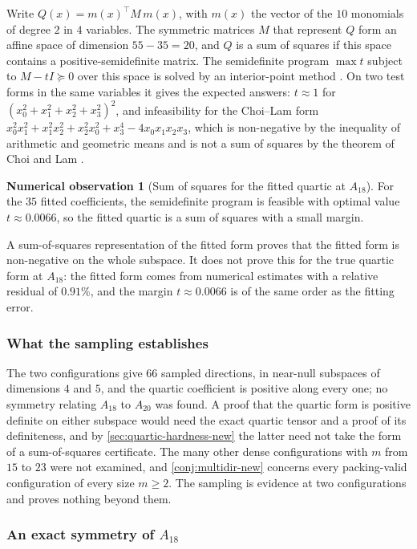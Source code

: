 \documentclass[11pt,reqno]{amsart}
\renewcommand{\_}{\origunderscore\allowbreak}
\numberwithin{equation}{section}
\theoremstyle{plain}
\theoremstyle{definition}
\newtheorem{numobs}[thm]{Numerical observation}
\theoremstyle{remark}
\begin{document}
Write $Q(x)=m(x)^\top M\,m(x)$, with $m(x)$ the vector of the $10$
monomials of degree $2$ in $4$ variables. The symmetric matrices $M$
that represent $Q$ form an affine space of dimension $55-35=20$, and $Q$
is a sum of squares if this space contains a positive-semidefinite
matrix. The semidefinite program $\max t$ subject to $M-tI\succeq0$ over
this space is solved by an interior-point method
\cite{DB16,GC26}. On two test forms in the same variables it gives the
expected answers: $t\approx1$ for $(x_0^2+x_1^2+x_2^2+x_3^2)^2$, and
infeasibility for the Choi--Lam form
$x_0^2x_1^2+x_1^2x_2^2+x_2^2x_0^2+x_3^4-4x_0x_1x_2x_3$, which is
non-negative by the inequality of arithmetic and geometric means and is
not a sum of squares by the theorem of Choi and Lam \cite{CL77}.

\begin{numobs}[Sum of squares for the fitted quartic at $A_{18}$]\label{prop:gram-sos-A18}
For the $35$ fitted coefficients, the semidefinite program is feasible
with optimal value $t\approx0.0066$, so the fitted quartic is a sum of
squares with a small margin.
\end{numobs}

A sum-of-squares representation of the fitted form proves that the
fitted form is non-negative on the whole subspace. It does not prove
this for the true quartic form at $A_{18}$: the fitted form comes from
numerical estimates with a relative residual of $0.91\%$, and the
margin $t\approx0.0066$ is of the same order as the fitting error.

\subsubsection{What the sampling establishes}

The two configurations give $66$ sampled directions, in near-null
subspaces of dimensions $4$ and $5$, and the quartic coefficient is
positive along every one; no symmetry relating $A_{18}$ to $A_{20}$ was
found. A proof that the quartic form is positive definite on either
subspace would need the exact quartic tensor and a proof of its
definiteness, and by \cref{sec:quartic-hardness-new} the latter need
not take the form of a sum-of-squares certificate. The many other dense
configurations with $m$ from $15$ to $23$ were not examined, and
\cref{conj:multidir-new} concerns every packing-valid configuration of
every size $m\ge2$. The sampling is evidence at two configurations and
proves nothing beyond them.

\subsubsection{An exact symmetry of \texorpdfstring{$A_{18}$}{A18}}\label{sec:a18-symmetry}
\end{document}
